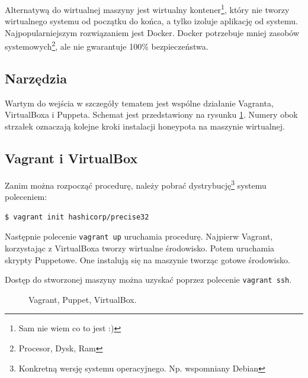 \documentclass[runningheads,a4paper]{llncs}
\begin{document}
Alternatywą do wirtualnej maszyny jest wirtualny kontener\footnote{Sam nie wiem co to jest :)}, który nie tworzy wirtualnego systemu od początku do końca, a tylko izoluje aplikację od systemu. Najpopularniejszym rozwiązaniem jest Docker. Docker potrzebuje mniej zasobów systemowych\footnote{Procesor, Dysk, Ram}, ale nie gwarantuje 100\% bezpieczeństwa.

\subsection{Narzędzia}

Wartym do wejścia w szczegóły tematem jest wspólne działanie Vagranta, VirtualBoxa i Puppeta. Schemat jest przedstawiony na rysunku \ref{fig:vagrant_fig}. Numery obok strzałek oznaczają kolejne kroki instalacji honeypota na maszynie wirtualnej.

\subsection*{Vagrant i VirtualBox}

Zanim można rozpocząć procedurę, należy pobrać dystrybucję\footnote{Konkretną wersję systemu operacyjnego. Np. wspomniany Debian} systemu poleceniem:
\begin{lstlisting}
$ vagrant init hashicorp/precise32
\end{lstlisting}

Następnie polecenie \texttt{vagrant up} uruchamia procedurę. Najpierw Vagrant, korzystając z VirtualBoxa tworzy wirtualne środowisko. Potem uruchamia skrypty Puppetowe. One instalują się na maszynie tworząc gotowe środowisko.

Dostęp do stworzonej maszyny można uzyskać poprzez polecenie \texttt{vagrant ssh}.

\begin{figure}
        \centering
        \caption{Vagrant, Puppet, VirtualBox.}
        \label{fig:vagrant_fig}
\end{figure}
\end{document}
